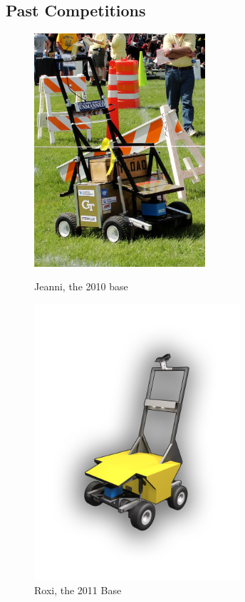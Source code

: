 \subsection{Past Competitions}

\begin{figure}[H]
\begin{minipage}[b]{0.5\linewidth}
\centering
\includegraphics[width=2.5in]{./pics/2010Jeanni.jpg}
\caption{Jeanni, the 2010 base}
\label{FIG:Jeanni}
\end{minipage}
\hspace{0.1in}
\begin{minipage}[b]{0.5\linewidth}
\centering
\includegraphics[width=3in]{./pics/RobotFrontCover.png}
\caption{Roxi, the 2011 Base}
\label{FIG:Trans}
\end{minipage}
\end{figure}
